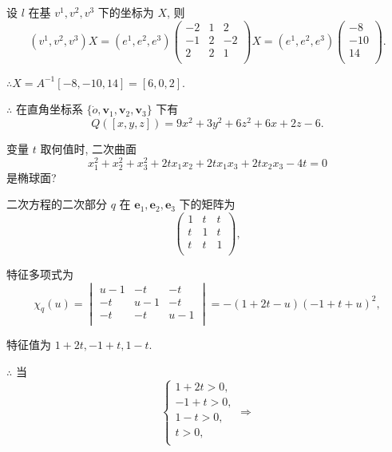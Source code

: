 \documentclass{ctexart}
\begin{document}
\begin{solution}
    设 $l$ 在基 $v^1,v^2,v^3$ 下的坐标为 $X$, 则
    \[(v^1,v^2,v^3)X=(e^1,e^2,e^3)\begin{pmatrix}
        -2 & 1 & 2  \\
        -1 & 2 & -2 \\
        2  & 2 & 1  \\
    \end{pmatrix}X=(e^1,e^2,e^3)\begin{pmatrix}
        -8 \\
        -10 \\
        14 \\
    \end{pmatrix}.\]

    $\therefore X=A^{-1}[-8,-10,14]=[6,0,2]$.

    $\therefore$ 在直角坐标系 $\{\dot{o},\boldsymbol{v}_1,\boldsymbol{v}_2,\boldsymbol{v}_3\}$ 下有
    \[Q([x,y,z])=9x^2+3y^2+6z^2+6x+2z-6.\]
\end{solution}
\begin{exercise}%
    变量 $t$ 取何值时, 二次曲面
    \[x_1^2+x_2^2+x_3^2+2tx_1x_2+2tx_1x_3+2tx_2x_3-4t=0\]
    是椭球面?
\end{exercise}
\begin{solution}
    二次方程的二次部分 $q$ 在 $\boldsymbol{e}_1,\boldsymbol{e}_2,\boldsymbol{e}_3$ 下的矩阵为
    \[\begin{pmatrix}
        1 & t & t \\
        t & 1 & t \\
        t & t & 1 \\
    \end{pmatrix},\]

    特征多项式为
    \[\chi_q(u)=\begin{vmatrix}
        u-1 & -t & -t \\
        -t & u-1 & -t \\
        -t & -t & u-1 \\
    \end{vmatrix}=-(1+2t-u)(-1+t+u)^2,\]

    特征值为 $1+2t,-1+t,1-t$.

    $\therefore$ 当
    \[\begin{cases}
        1+2t>0, \\
        -1+t>0, \\
        1-t>0, \\
        t>0, \\
    \end{cases}\Rightarrow\]
\end{solution}
\end{document}
